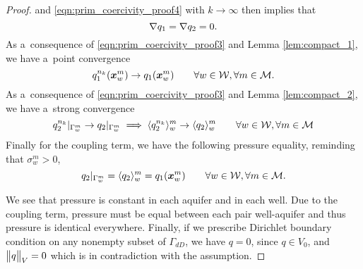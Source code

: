 \begin{proof}
and \eqref{eqn:prim_coercivity_proof4} with $k\rightarrow\infty$ then implies that
\begin{equation}
    \nabla q_1 = \nabla q_2 = 0.
\end{equation}
As a~consequence of \eqref{eqn:prim_coercivity_proof3} and Lemma \ref{lem:compact_1}, we have a~point convergence
\begin{equation} \label{eqn:prim_coercivity_proof5}
    q^{n_k}_1(\mathbf{\boldsymbol{x}}^m_w) \rightarrow q_1(\mathbf{\boldsymbol{x}}^m_w)
    \qquad \forall w\in\mathcal{W}, \forall m\in\mathcal{M}.
\end{equation}
As a~consequence of \eqref{eqn:prim_coercivity_proof3} and Lemma \ref{lem:compact_2}, we have a~strong convergence
\begin{equation} \label{eqn:prim_coercivity_proof7}
    q^{n_k}_2|_{\Gamma^m_w} \rightarrow q_2|_{\Gamma^m_w} \implies \langle q^{n_k}_2\rangle^m_w \rightarrow \langle q_2\rangle^m_w
    \qquad \forall w\in\mathcal{W}, \forall m\in\mathcal{M}
\end{equation}
Finally for the coupling term, we have the following pressure equality, reminding that $\sigma^m_w>0$,
\begin{equation} \label{eqn:prim_coercivity_proof8}
    q_2|_{\Gamma^m_w} = \langle q_2\rangle^m_w = q_1(\mathbf{\boldsymbol{x}}^m_w)
    \qquad \forall w\in\mathcal{W}, \forall m\in\mathcal{M}.
\end{equation}

We see that pressure is constant in each aquifer and in each well.
Due to the coupling term, pressure must be equal between each pair well-aquifer and thus pressure is identical everywhere.
Finally, if we prescribe Dirichlet boundary condition on any nonempty subset of $\Gamma_{dD}$, we have $q=0$, since $q\in V_0$,
and $\bigl\Vert q\bigr\Vert_V=0$ which is in contradiction with the assumption.
\end{proof}



